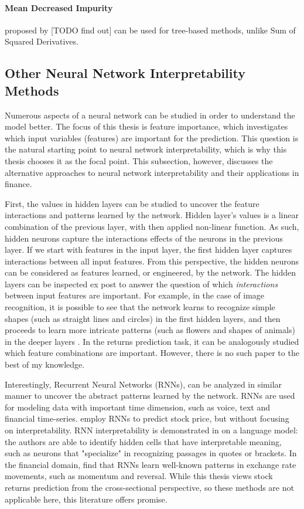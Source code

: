 {			\paragraph{Mean Decreased Impurity} proposed by [TODO find out] can be used for tree-based methods, unlike Sum of Squared Derivatives.  
			
		
		\subsection{Other Neural Network Interpretability Methods}
			Numerous aspects of a neural network can be studied in order to understand the model better. The focus of this thesis is feature importance, which investigates which input variables (features) are important for the prediction. This question is the natural starting point to neural network interpretability, which is why this thesis chooses it as the focal point. This subsection, however, discusses the alternative approaches to neural network interpretability and their applications in finance. 
			
			First, the values in hidden layers can be studied to uncover the feature interactions and patterns learned by the network. Hidden layer's values is a linear combination of the previous layer, with then applied non-linear function. As such, hidden neurons capture the interactions effects of the neurons in the previous layer. If we start with features in the input layer, the first hidden layer captures interactions between all input features. From this perspective, the hidden neurons can be considered as features learned, or engineered, by the network. The hidden layers can be inspected ex post to answer the question of which \textit{interactions} between input features are important. For example, in the case of image recognition, it is possible to see that the network learns to recognize simple shapes (such as straight lines and circles) in the first hidden layers, and then proceeds to learn more intricate patterns (such as flowers and shapes of animals) in the deeper layers \citep{olah2017feature}. In the returns prediction task, it can be analogously studied which feature combinations are important. However, there is no such paper to the best of my knowledge. 
			
			Interestingly, Recurrent Neural Networks (RNNs), can be analyzed in similar manner to uncover the abstract patterns learned by the network. RNNs are used for modeling data with important time dimension, such as voice, text and financial time-series. \cite{di2016artificial} employ RNNs to predict stock price, but without focusing on interpretability. RNN interpretability is demonstrated in \cite{karpathy2015visualizing} on a language model: the authors are able to identify hidden cells that have interpretable meaning, such as neurons that "specialize" in recognizing passages in quotes or brackets. In the financial domain, \cite{giles1997rule} find that RNNs learn well-known patterns in exchange rate movements, such as momentum and reversal. While this thesis views stock returns prediction from the cross-sectional perspective, so these methods are not applicable here, this literature offers promise.  
			
}
